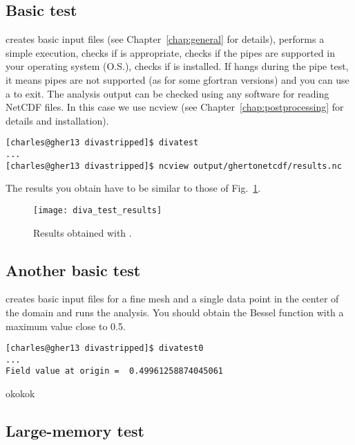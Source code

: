 \subsection{Basic test}

 creates basic input files (see Chapter~\ref{chap:general} for details), performs a simple \diva execution,
checks if  is appropriate, checks if the pipes are supported in your operating system (O.S.), checks if 
is installed.
If  hangs during the pipe test, it means pipes are not supported (as for some gfortran versions) 
and you can use a  to exit. The analysis output can be checked using any software for reading 
NetCDF files. In this case we use ncview (see Chapter~\ref{chap:postprocessing} for details and installation). 

\begin{lstlisting}[style=Bash]
[charles@gher13 divastripped]$ divatest
...
[charles@gher13 divastripped]$ ncview output/ghertonetcdf/results.nc
\end{lstlisting}
The results you obtain have to be similar to those of Fig.~\ref{fig:diva_test_results}.

\begin{figure}[H]
\centering 
\texttt{[image: diva\_test\_results]}
\caption{Results obtained with .\label{fig:diva_test_results}}
\end{figure}


\subsection{Another basic test}

 creates basic input files for a fine mesh and a single data point in the center of the domain and runs the analysis. You should obtain the  Bessel function with a maximum value close to 0.5.

\begin{lstlisting}[style=Bash]
[charles@gher13 divastripped]$ divatest0
...
Field value at origin =  0.49961258874045061
\end{lstlisting}

\info okokok


\subsection{Large-memory test}

